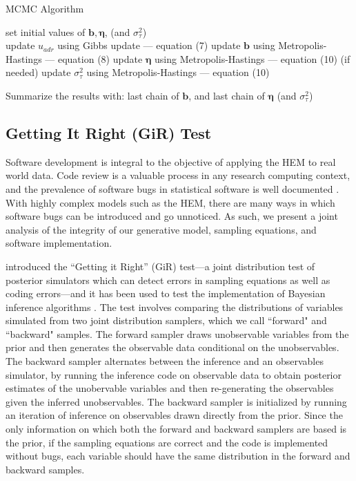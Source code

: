 \documentclass[ba]{imsart}
\def\spacingset#1{\renewcommand{\baselinestretch}%
	{#1}\small\normalsize} \spacingset{1}
\numberwithin{equation}{section}
\theoremstyle{plain}
\begin{document}
\begin{algorithm}[!b]
	\spacingset{1}
	\SetAlgoLined
	\caption{MCMC Algorithm}
	\begin{algorithmic}
	\STATE set initial values of $\boldsymbol{b}, \boldsymbol{\eta}$, (and $\sigma_\tau^2$)\\
					\STATE update $u_{adr}$ using Gibbs update --- equation (7)
			\ENDFOR
		\ENDFOR
		\ENDFOR
			\STATE update $\boldsymbol{b}$ using Metropolis-Hastings --- equation (8)
		\ENDFOR
			\STATE update $\boldsymbol{\eta}$ using Metropolis-Hastings --- equation (10)
			\STATE (if needed) update $\sigma_\tau^2$ using Metropolis-Hastings --- equation (10)
		\ENDFOR

	\ENDFOR
	\STATE	Summarize the results with: last chain of $\boldsymbol{b}$, and last chain of $\boldsymbol{\eta}$ (and $\sigma_\tau^2$) 
\end{algorithmic}
\label{alg:MCMC}
\end{algorithm}
\subsection{Getting It Right (GiR) Test} \label{subec:GiR}
  Software development is integral to the objective of applying the HEM to real world data. Code review is a valuable process in any research computing context, and the prevalence of software bugs in statistical software is well documented \citep[e.g., ][]{altman2004numerical,mccullough2009accuracy}.  With highly complex models such as the HEM, there are many ways in which software bugs can be introduced and go unnoticed. As such, we present a joint analysis of the integrity of our generative model, sampling equations, and software implementation. 
  
   \cite{geweke2004getting} introduced the ``Getting it Right'' (GiR) test---a joint distribution test of posterior simulators which can detect errors in sampling equations as well as coding errors---and it has been used to test the implementation of Bayesian inference algorithms \citep{zhao2016bayesian}.  The test involves comparing the distributions of variables simulated from two joint distribution samplers, which we call ``forward" and ``backward" samples. The forward sampler draws unobservable variables from the prior and then generates the observable data conditional on the unobservables. The backward sampler alternates between the inference and an observables simulator, by running the inference code on observable data to obtain posterior estimates of the unobervable variables and then re-generating the observables given the inferred unobservables. The backward sampler is initialized by running an iteration of inference on observables drawn directly from the prior. Since the only information on which both the forward and backward samplers are based is the prior, if the sampling equations are correct and the code is implemented without bugs, each variable should have the same distribution in the forward and backward samples.
   
\end{document}
